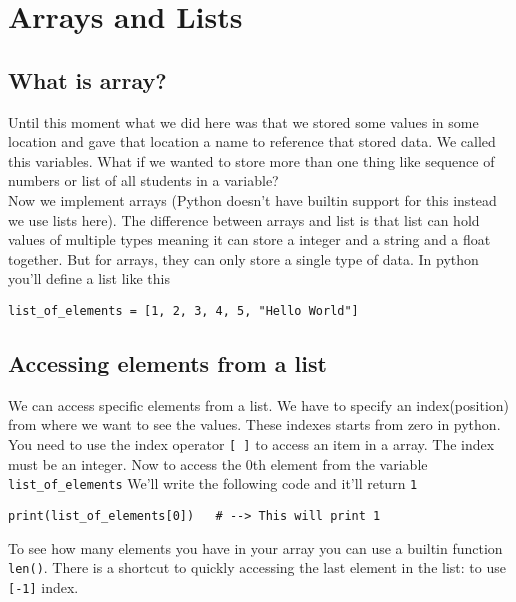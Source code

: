 \chapter{Arrays and Lists}

\section{What is array?}

\noindent Until this moment what we did here was that we stored some values in some location and gave that location a name to reference that stored data. We called this variables. What if we wanted to store more than one thing like sequence of numbers or list of all students in a variable?\\

\noindent Now we implement arrays (Python doesn't have builtin support for this instead we use lists here). The difference between arrays and list is that list can hold values of multiple types meaning it can store a integer and a string and a float together. But for arrays, they can only store a single type of data. In python you'll define a list like this

\noindent\begin{minipage}{\linewidth}
\begin{lstlisting}[style=python]
list_of_elements = [1, 2, 3, 4, 5, "Hello World"]
\end{lstlisting}
\end{minipage}

\section{Accessing elements from a list}
\noindent We can access specific elements from a list. We have to specify an index(position) from where we want to see the values. These indexes starts from zero in python. You need to use the index operator \texttt{[ ]} to access an item in a array. The index must be an integer. Now to access the 0th element from the variable \texttt{list\_of\_elements} We'll write the following code and it'll return \texttt{1}

\noindent\begin{minipage}{\linewidth}
\begin{lstlisting}[style=python]
print(list_of_elements[0])   # --> This will print 1
\end{lstlisting}
\end{minipage}

\noindent To see how many elements you have in your array you can use a builtin function \texttt{len()}. There is a shortcut to quickly accessing the last element in the list: to use \texttt{[-1]} index.


